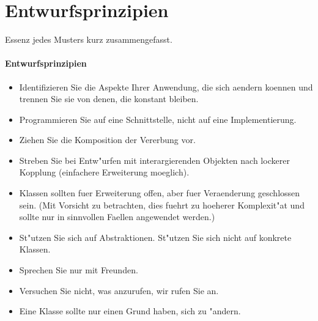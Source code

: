 \section{Entwurfsprinzipien}
Essenz jedes Musters kurz zusammengefasst. 

\paragraph{Entwurfsprinzipien}

\begin{itemize}[leftmargin=0.2in]
	\item Identifizieren Sie die Aspekte Ihrer Anwendung, die sich aendern koennen und trennen Sie sie 
  von denen, die konstant bleiben.
	\item Programmieren Sie auf eine Schnittstelle, nicht auf eine Implementierung.
	\item Ziehen Sie die Komposition der Vererbung vor.
	\item Streben Sie bei Entw"urfen mit interargierenden Objekten nach lockerer Kopplung (einfachere 
Erweiterung moeglich).
	\item Klassen sollten fuer Erweiterung offen, aber fuer Veraenderung geschlossen sein. (Mit Vorsicht zu 
betrachten, dies fuehrt zu hoeherer Komplexit"at und sollte nur in sinnvollen Faellen 
angewendet werden.)
	\item St"utzen Sie sich auf Abstraktionen. St"utzen Sie sich nicht auf konkrete Klassen.  
	\item Sprechen Sie nur mit Freunden.
	\item Versuchen Sie nicht, was anzurufen, wir rufen Sie an.
	\item Eine Klasse sollte nur einen Grund haben, sich zu "andern.
\end{itemize}


